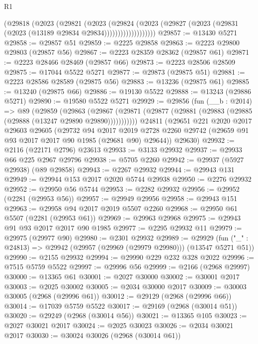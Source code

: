 \begin{lexlean}{R1}
\begin{coremodule}
                    (@29818
                      (@2023
                        (@29821
                          (@2023
                            (@29824
                              (@2023
                                (@29827
                                  (@2023 (@29831 (@2023 (@13189 @29834 @29834)))))))))))))))))))
@29857 := @13430 @5271
@29858 := @29857 @51
@29859 := @2225 @29858
@29863 := @2223 @29800 @29803 (@29857 @56)
@29867 := @2223 @28359 @28362 (@29857 @61)
@29871 := @2223 @28466 @28469 (@29857 @66)
@29873 := @2223 @28506 @28509
@29875 := @17044 @5522 @5271
@29877 := @29873 (@29875 @51)
@29881 := @2223 @28586 @28589 (@29875 @56)
@29883 := @13236 (@29875 @61)
@29885 := @13240 (@29875 @66)
@29886 := @19130 @5522
@29888 := @13243 (@29886 @5271)
@29890 := @19580 @5522 @5271
@29929 := @29856
    (fun (__b : @2014) =>
    @89
      (@29859
        (@29863
          (@29867 (@29871 (@29877 (@29881 (@29883 (@29885 (@29888 (@13247 @29890 @29890)))))))))))
    @24811
    (@29651
      @221
      @2020
      @2017
      @29603
      @29605
      (@29732
        @94
        @2017
        @2019
        @2728
        @2260
        @29742
        (@29659 @91 @93 @2017 @2017 @90 @1985 (@29681 @90) @29644))
      @29630)
@29932 := @2116 (@22171 @2796) @23613
@29933 := @3133 @29932
@29937 := @29933 @66 @225 @2967 @29796
@29938 := @5705 @2260
@29942 := @29937 (@5927 @29938) (@89 @29858)
@29943 := @2267 @29932
@29944 := @29943 @131
@29949 := @29944 @153 @2017 @2020 @5744 @29938
@29950 := @2276 @29932
@29952 := @29950 @56 @5744
@29953 := @2282 @29932
@29956 := @29952 (@2281 (@29953 @56))
@29957 := @29949 @29956
@29958 := @29943 @151
@29963 := @29958 @94 @2017 @2019 @5507 @2260
@29968 := @29950 @61 @5507 (@2281 (@29953 @61))
@29969 := @29963 @29968
@29975 := @29943 @91 @93 @2017 @2017 @90 @1985
@29977 := @2295 @29932 @11
@29979 := @29975 (@29977 @90)
@29980 := @2301 @29932
@29989 := @29929 (fun ("_" : @24813) => @29942 (@29957 (@29969 (@29979 @29980))) (@13547 @5271 @51))
@29990 := @2155 @29932
@29994 := @29990 @229 @232 @328 @2022
@29996 := @7515 @5759 @5522
@29997 := @29996 @56
@29999 := @2166 (@2968 @29997)
@30000 := @13365 @61
@30001 := @2027 @30000
@30002 := @30001 @2017
@30003 := @2025 @30002
@30005 := @2034 @30000 @2017
@30009 := @30003 @30005 (@2968 (@29996 @61))
@30012 := @29129 (@2968 (@29996 @66))
@30014 := @17039 @5759 @5522
@30017 := @29169 (@2968 (@30014 @51))
@30020 := @29249 (@2968 (@30014 @56))
@30021 := @13365 @105
@30023 := @2027 @30021 @2017
@30024 := @2025 @30023
@30026 := @2034 @30021 @2017
@30030 := @30024 @30026 (@2968 (@30014 @61))

\end{coremodule}
\end{lexlean}
